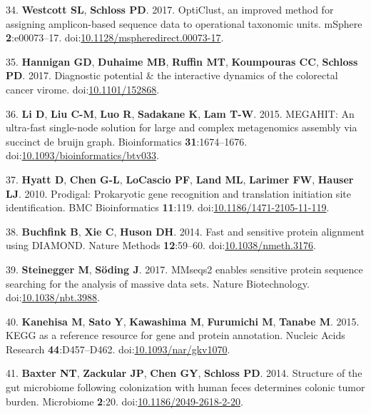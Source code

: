 \documentclass[11pt,]{article}
\begin{document}
\hypertarget{ref-opticlust_westcott2017}{}
34. \textbf{Westcott SL}, \textbf{Schloss PD}. 2017. OptiClust, an
improved method for assigning amplicon-based sequence data to
operational taxonomic units. mSphere \textbf{2}:e00073--17.
doi:\href{https://doi.org/10.1128/mspheredirect.00073-17}{10.1128/mspheredirect.00073-17}.

\hypertarget{ref-Hannigan2017}{}
35. \textbf{Hannigan GD}, \textbf{Duhaime MB}, \textbf{Ruffin MT},
\textbf{Koumpouras CC}, \textbf{Schloss PD}. 2017. Diagnostic potential
\& the interactive dynamics of the colorectal cancer virome.
doi:\href{https://doi.org/10.1101/152868}{10.1101/152868}.

\hypertarget{ref-Li2015}{}
36. \textbf{Li D}, \textbf{Liu C-M}, \textbf{Luo R}, \textbf{Sadakane
K}, \textbf{Lam T-W}. 2015. MEGAHIT: An ultra-fast single-node solution
for large and complex metagenomics assembly via succinct de bruijn
graph. Bioinformatics \textbf{31}:1674--1676.
doi:\href{https://doi.org/10.1093/bioinformatics/btv033}{10.1093/bioinformatics/btv033}.

\hypertarget{ref-Hyatt2010}{}
37. \textbf{Hyatt D}, \textbf{Chen G-L}, \textbf{LoCascio PF},
\textbf{Land ML}, \textbf{Larimer FW}, \textbf{Hauser LJ}. 2010.
Prodigal: Prokaryotic gene recognition and translation initiation site
identification. BMC Bioinformatics \textbf{11}:119.
doi:\href{https://doi.org/10.1186/1471-2105-11-119}{10.1186/1471-2105-11-119}.

\hypertarget{ref-Buchfink2014}{}
38. \textbf{Buchfink B}, \textbf{Xie C}, \textbf{Huson DH}. 2014. Fast
and sensitive protein alignment using DIAMOND. Nature Methods
\textbf{12}:59--60.
doi:\href{https://doi.org/10.1038/nmeth.3176}{10.1038/nmeth.3176}.

\hypertarget{ref-Steinegger2017}{}
39. \textbf{Steinegger M}, \textbf{Söding J}. 2017. MMseqs2 enables
sensitive protein sequence searching for the analysis of massive data
sets. Nature Biotechnology.
doi:\href{https://doi.org/10.1038/nbt.3988}{10.1038/nbt.3988}.

\hypertarget{ref-Kanehisa2015}{}
40. \textbf{Kanehisa M}, \textbf{Sato Y}, \textbf{Kawashima M},
\textbf{Furumichi M}, \textbf{Tanabe M}. 2015. KEGG as a reference
resource for gene and protein annotation. Nucleic Acids Research
\textbf{44}:D457--D462.
doi:\href{https://doi.org/10.1093/nar/gkv1070}{10.1093/nar/gkv1070}.

\hypertarget{ref-scfa_baxter2014}{}
41. \textbf{Baxter NT}, \textbf{Zackular JP}, \textbf{Chen GY},
\textbf{Schloss PD}. 2014. Structure of the gut microbiome following
colonization with human feces determines colonic tumor burden.
Microbiome \textbf{2}:20.
doi:\href{https://doi.org/10.1186/2049-2618-2-20}{10.1186/2049-2618-2-20}.
\end{document}
